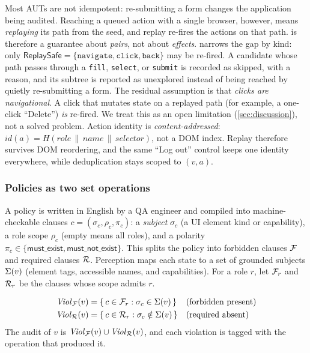 Most AUTs are not idempotent: re-submitting a form changes the application
being audited. Reaching a queued action with a single browser, however, means
\emph{replaying} its path from the seed, and replay re-fires the actions on
that path.  is therefore a guarantee about \emph{pairs}, not
about \emph{effects}. \sys{} narrows the gap by kind: only
$\textsf{ReplaySafe}=\{\texttt{navigate},\texttt{click},\texttt{back}\}$ may be
re-fired. A candidate whose path passes through a \texttt{fill},
\texttt{select}, or \texttt{submit} is recorded as skipped, with a reason, and
its subtree is reported as unexplored instead of being reached by quietly
re-submitting a form. The residual assumption is that \emph{clicks are
navigational}. A click that mutates state on a replayed path (for example, a
one-click ``Delete'') \emph{is} re-fired. We treat this as an open limitation
(\cref{sec:discussion}), not a solved problem. Action identity is
\emph{content-addressed}:
$\mathit{id}(a)=H(\mathit{role}\,\|\,\mathit{name}\,\|\,\mathit{selector})$, not
a DOM index. Replay therefore survives DOM reordering, and the same ``Log out''
control keeps one identity everywhere, while deduplication stays scoped to
$(v,a)$.

\subsubsection{Policies as two set operations}

A policy is written in English by a QA engineer and compiled into
machine-checkable clauses $c=(\sigma_c,\rho_c,\pi_c)$: a \emph{subject}
$\sigma_c$ (a UI element kind or capability), a role scope $\rho_c$ (empty
means all roles), and a polarity $\pi_c\in\{\textsf{must\_exist},
\textsf{must\_not\_exist}\}$. This splits the policy into forbidden clauses
$\mathcal{F}$ and required clauses $\mathcal{R}$. Perception maps each state to a set of
grounded subjects $\Sigma(v)$ (element tags, accessible names, and capabilities).
For a role $r$, let $\mathcal{F}_r$ and $\mathcal{R}_r$ be the clauses whose scope admits
$r$.

\begin{definition}
\begin{align}
\mathit{Viol}_{\mathcal{F}}(v) &= \{\,c\in\mathcal{F}_r : \sigma_c\in\Sigma(v)\,\}
  && \text{(forbidden present)}\label{eq:forb}\\
\mathit{Viol}_{\mathcal{R}}(v)  &= \{\,c\in\mathcal{R}_r : \sigma_c\notin\Sigma(v)\,\}
  && \text{(required absent)}\label{eq:req}
\end{align}
The audit of $v$ is $\mathit{Viol}_{\mathcal{F}}(v)\cup\mathit{Viol}_{\mathcal{R}}(v)$, and each
violation is tagged with the operation that produced it.
\end{definition}

